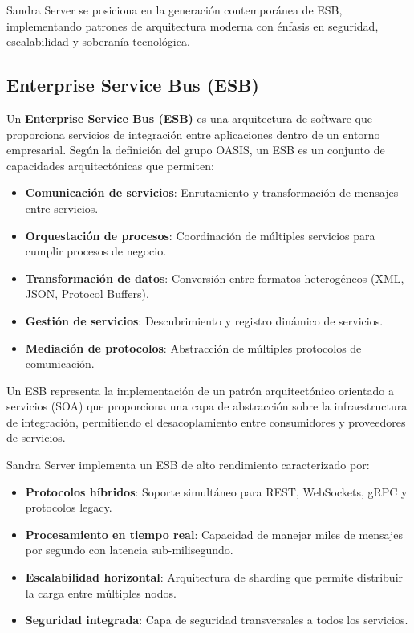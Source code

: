 Sandra Server se posiciona en la generación contemporánea de ESB, implementando patrones de arquitectura moderna con énfasis en seguridad, escalabilidad y soberanía tecnológica.

\subsection{Enterprise Service Bus (ESB)}

Un \textbf{Enterprise Service Bus (ESB)} es una arquitectura de software que proporciona servicios de integración entre aplicaciones dentro de un entorno empresarial. Según la definición del grupo OASIS, un ESB es un conjunto de capacidades arquitectónicas que permiten:

\begin{itemize}
\item \textbf{Comunicación de servicios}: Enrutamiento y transformación de mensajes entre servicios.
\item \textbf{Orquestación de procesos}: Coordinación de múltiples servicios para cumplir procesos de negocio.
\item \textbf{Transformación de datos}: Conversión entre formatos heterogéneos (XML, JSON, Protocol Buffers).
\item \textbf{Gestión de servicios}: Descubrimiento y registro dinámico de servicios.
\item \textbf{Mediación de protocolos}: Abstracción de múltiples protocolos de comunicación.
\end{itemize}

\begin{definicion}
Un ESB representa la implementación de un patrón arquitectónico orientado a servicios (SOA) que proporciona una capa de abstracción sobre la infraestructura de integración, permitiendo el desacoplamiento entre consumidores y proveedores de servicios.
\end{definicion}

Sandra Server implementa un ESB de alto rendimiento caracterizado por:

\begin{itemize}
\item \textbf{Protocolos híbridos}: Soporte simultáneo para REST, WebSockets, gRPC y protocolos legacy.
\item \textbf{Procesamiento en tiempo real}: Capacidad de manejar miles de mensajes por segundo con latencia sub-milisegundo.
\item \textbf{Escalabilidad horizontal}: Arquitectura de sharding que permite distribuir la carga entre múltiples nodos.
\item \textbf{Seguridad integrada}: Capa de seguridad transversales a todos los servicios.
\end{itemize}

